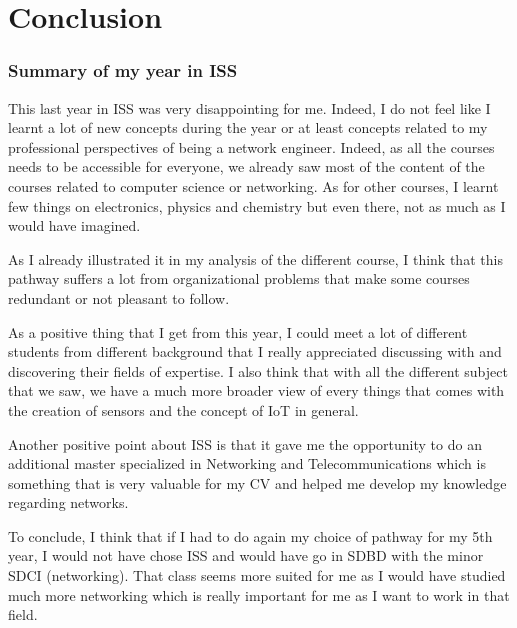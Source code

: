 \part{Conclusion}

\section{Summary of my year in ISS}

This last year in ISS was very disappointing for me. Indeed, I do not feel like I learnt a lot of new concepts during the year or at least concepts related to my professional perspectives of being a network engineer. Indeed, as all the courses needs to be accessible for everyone, we already saw most of the content of the courses related to computer science or networking. As for other courses, I learnt few things on electronics, physics and chemistry but even there, not as much as I would have imagined. \par
As I already illustrated it in my analysis of the different course, I think that this pathway suffers a lot from organizational problems that make some courses redundant or not pleasant to follow. \\\par

As a positive thing that I get from this year, I could meet a lot of different students from different background that I really appreciated discussing with and discovering their fields of expertise. I also think that with all the different subject that we saw, we have a much more broader view of every things that comes with the creation of sensors and the concept of IoT in general. \par
Another positive point about ISS is that it gave me the opportunity to do an additional master specialized in Networking and Telecommunications which is something that is very valuable for my CV and helped me develop my knowledge regarding networks. 
\\\par
To conclude, I think that if I had to do again my choice of pathway for my 5th year, I would not have chose ISS and would have go in SDBD with the minor SDCI (networking). That class seems more suited for me as I would have studied much more networking which is really important for me as I want to work in that field.
